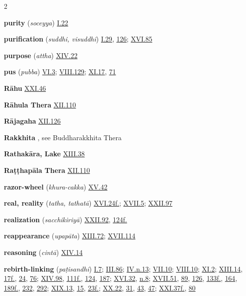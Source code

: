\begin{multicols}{2}
\begin{vismHanging}
\par\textbf{purity} (\emph{soceyya}) \hyperlink{I.22}{I.22}{}
\par\textbf{purification} (\emph{suddhi, visuddhi}) \hyperlink{I.29}{I.29}{}, \hyperlink{I.126}{126}{}; \hyperlink{XVI.85}{XVI.85}{}
\par\textbf{purpose} (\emph{attha}) \hyperlink{XIV.22}{XIV.22}{}
\par\textbf{pus} \emph{ }(\emph{pubba}) \hyperlink{VI.3}{VI.3}{}; \hyperlink{VIII.129}{VIII.129}{}; \hyperlink{XI.17}{XI.17}{}, \hyperlink{XI.71}{71}{}
\par\textbf{Rāhu} \hyperlink{XXI.46}{XXI.46}{}
\par\textbf{Rāhula Thera} \hyperlink{XII.110}{XII.110}{}
\par\textbf{Rājagaha} \hyperlink{XII.126}{XII.126}{}
\par\textbf{Rakkhita} , see Buddharakkhita Thera
\par\textbf{Rathakāra, Lake} \hyperlink{XIII.38}{XIII.38}{}
\par\textbf{Raṭṭhapāla Thera} \hyperlink{XII.110}{XII.110}{}
\par\textbf{razor-wheel} (\emph{khura-cakka}) \hyperlink{XV.42}{XV.42}{}
\par\textbf{real, reality} (\emph{tatha, tathatā}) \hyperlink{XVI.24}{XVI.24f.}{}; \hyperlink{XVII.5}{XVII.5}{}; \hyperlink{XXII.97}{XXII.97}{}
\par\textbf{realization} (\emph{sacchikiriyā}) \hyperlink{XXII.92}{XXII.92}{}, \hyperlink{XXII.124}{124f.}{}
\par\textbf{reappearance} (\emph{upapāta}) \hyperlink{XIII.72}{XIII.72}{}; \hyperlink{XVII.114}{XVII.114}{}
\par\textbf{reasoning} (\emph{cintā}) \hyperlink{XIV.14}{XIV.14}{}
\par\textbf{rebirth-linking} (\emph{paṭisandhi}) \hyperlink{I.7}{I.7}{}; \hyperlink{III.86}{III.86}{}; \hyperlink{IV.n13}{IV.n.13}{}; \hyperlink{VII.10}{VII.10}{}; \hyperlink{VIII.10}{VIII.10}{}; \hyperlink{XI.2}{XI.2}{}; \hyperlink{XIII.14}{XIII.14}{}, \hyperlink{XIII.17}{17f.}{}, \hyperlink{XIII.24}{24}{}, \hyperlink{XIII.76}{76}{}; \hyperlink{XIV.98}{XIV.98}{}, \hyperlink{XIV.111}{111f.}{}, \hyperlink{XIV.124}{124}{}, \hyperlink{XIV.187}{187}{}; \hyperlink{XVI.32}{XVI.32}{}, \hyperlink{XVI.n8}{n.8}{}; \hyperlink{XVII.51}{XVII.51}{}, \hyperlink{XVII.89}{89}{}, \hyperlink{XVII.126}{126}{}, \hyperlink{XVII.133}{133f.}{}, \hyperlink{XVII.164}{164}{}, \hyperlink{XVII.189}{189f.}{}, \hyperlink{XVII.232}{232}{}, \hyperlink{XVII.292}{292}{}; \hyperlink{XIX.13}{XIX.13}{}, \hyperlink{XIX.15}{15}{}, \hyperlink{XIX.23}{23f.}{}; \hyperlink{XX.22}{XX.22}{}, \hyperlink{XX.31}{31}{}, \hyperlink{XX.43}{43}{}, \hyperlink{XX.47}{47}{}; \hyperlink{XXI.37}{XXI.37f.}{}, \hyperlink{XXI.80}{80}{}

\end{vismHanging}
\end{multicols}
